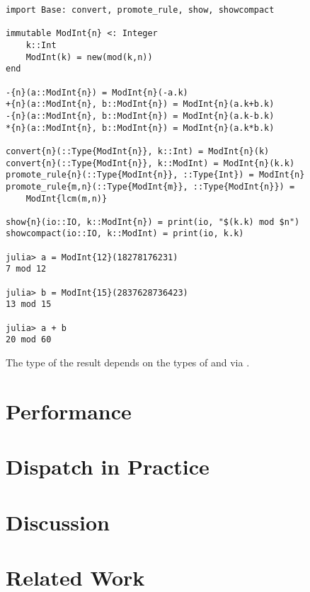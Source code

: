 \documentclass[pldi]{sigplanconf-pldi15}
\begin{document}
\begin{verbatim}
import Base: convert, promote_rule, show, showcompact

immutable ModInt{n} <: Integer
    k::Int
    ModInt(k) = new(mod(k,n))
end

-{n}(a::ModInt{n}) = ModInt{n}(-a.k)
+{n}(a::ModInt{n}, b::ModInt{n}) = ModInt{n}(a.k+b.k)
-{n}(a::ModInt{n}, b::ModInt{n}) = ModInt{n}(a.k-b.k)
*{n}(a::ModInt{n}, b::ModInt{n}) = ModInt{n}(a.k*b.k)

convert{n}(::Type{ModInt{n}}, k::Int) = ModInt{n}(k)
convert{n}(::Type{ModInt{n}}, k::ModInt) = ModInt{n}(k.k)
promote_rule{n}(::Type{ModInt{n}}, ::Type{Int}) = ModInt{n}
promote_rule{m,n}(::Type{ModInt{m}}, ::Type{ModInt{n}}) =
    ModInt{lcm(m,n)}

show{n}(io::IO, k::ModInt{n}) = print(io, "$(k.k) mod $n")
showcompact(io::IO, k::ModInt) = print(io, k.k)

julia> a = ModInt{12}(18278176231)
7 mod 12

julia> b = ModInt{15}(2837628736423)
13 mod 15

julia> a + b
20 mod 60
\end{verbatim}

The type of the result  depends on the types of  and  via .

\section{Performance}



\section{Dispatch in Practice}


\section{Discussion}



\section{Related Work}
\end{document}
